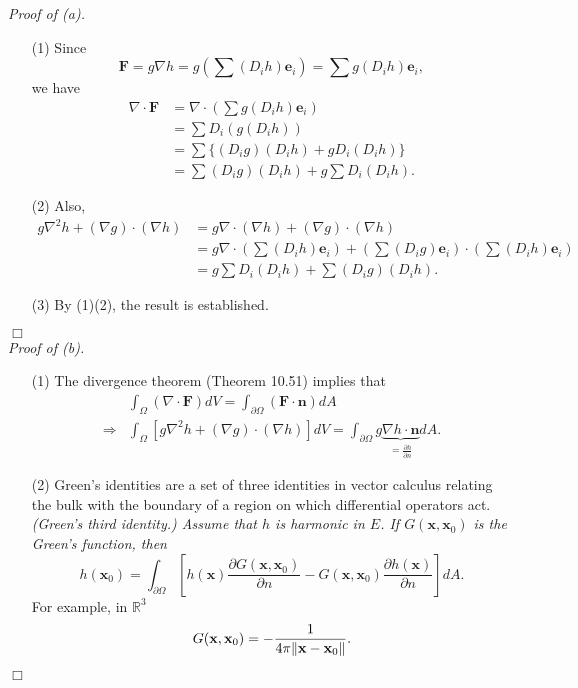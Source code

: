 \documentclass{article}
\begin{document}
\emph{Proof of (a).}
\begin{enumerate}
\item[(1)]
  Since
  \[
    \mathbf{F}
    = g \nabla h
    = g \left(\sum (D_i h)\mathbf{e}_i \right)
    = \sum g(D_i h)\mathbf{e}_i,
  \]
  we have
  \begin{align*}
    \nabla \cdot \mathbf{F}
    &= \nabla \cdot \left( \sum g(D_i h)\mathbf{e}_i \right) \\
    &= \sum D_i(g(D_i h)) \\
    &= \sum \{ (D_i g)(D_i h) + g D_i(D_i h) \} \\
    &= \sum (D_i g)(D_i h) + g \sum D_i(D_i h).
  \end{align*}

\item[(2)]
  Also,
  \begin{align*}
    g \nabla^2 h + (\nabla g) \cdot (\nabla h)
    &= g \nabla \cdot (\nabla h) + (\nabla g) \cdot (\nabla h) \\
    &= g \nabla \cdot \left(\sum (D_i h)\mathbf{e}_i \right)
      + \left(\sum (D_i g)\mathbf{e}_i \right) \cdot \left(\sum (D_i h)\mathbf{e}_i \right) \\
    &= g \sum D_i(D_i h) + \sum (D_i g)(D_i h).
  \end{align*}

\item[(3)]
  By (1)(2), the result is established.
\end{enumerate}
$\Box$ \\



\emph{Proof of (b).}
\begin{enumerate}
\item[(1)]
  The divergence theorem (Theorem 10.51) implies that
  \begin{align*}
    &\int_{\Omega} (\nabla \cdot \mathbf{F}) dV
    = \int_{\partial\Omega} (\mathbf{F} \cdot \mathbf{n}) dA \\
    \Longrightarrow&
    \int_{\Omega} [g \nabla^2 h + (\nabla g) \cdot (\nabla h)] dV
    = \int_{\partial\Omega} g \underbrace{\nabla h \cdot \mathbf{n}}_{=\frac{\partial h}{\partial n}} dA.
  \end{align*}

\item[(2)]
  Green's identities are a set of three identities in vector calculus
  relating the bulk with the boundary of a region on which differential operators act.
  \emph{(Green's third identity.)
  Assume that $h$ is harmonic in $E$.
  If $G(\mathbf{x},\mathbf{x}_0)$ is the Green's function,
  then}
  \[
    h(\mathbf{x}_0)
    = \int_{\partial \Omega}
      \left[ h(\mathbf{x}) \frac{\partial G(\mathbf{x},\mathbf{x}_0)}{\partial n}
      - G(\mathbf{x},\mathbf{x}_0) \frac{\partial h(\mathbf{x})}{\partial n} \right] dA.
  \]
  For example, in $\mathbb{R}^3$
  \[
    G(\mathbf{x},\mathbf{x}_0) = -\frac{1}{4\pi\norm{\mathbf{x} - \mathbf{x}_0}}.
  \]
\end{enumerate}
$\Box$ \\
\end{document}
